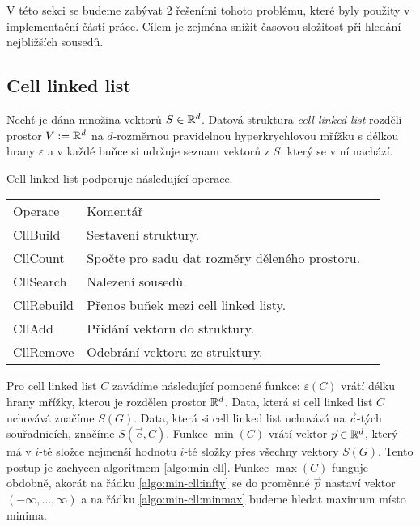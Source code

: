V této sekci se budeme zabývat 2 řešeními tohoto problému, které byly použity v implementační části práce. Cílem je zejména snížit časovou složitost při hledání nejbližších sousedů.

\subsection{Cell linked list}

\label{defi:cll}
\begin{defi}
  Nechť je dána množina vektorů $S \in \mathbb{R}^d$. Datová struktura \textit{cell linked list} rozdělí prostor $V := \mathbb{R}^d$ na $d$-rozměrnou pravidelnou hyperkrychlovou mřížku s délkou hrany $\varepsilon$ a v každé buňce si udržuje seznam vektorů z $S$, který se v ní nachází.\cite[s.~149--152]{computer_simulation_of_liquids}
\end{defi}

Cell linked list podporuje následující operace.

\begin{table}[ht!]
  \begin{tabular}{lll}
    Operace & Komentář\\
    CllBuild & Sestavení struktury.\\
    CllCount & Spočte pro sadu dat rozměry děleného prostoru.\\
    CllSearch & Nalezení sousedů.\\
    CllRebuild & Přenos buňek mezi cell linked listy.\\
    CllAdd & Přidání vektoru do struktury.\\
    CllRemove & Odebrání vektoru ze struktury.\\
  \end{tabular}
\end{table}

Pro cell linked list $C$ zavádíme následující pomocné funkce: $\varepsilon(C)$ vrátí délku hrany mřížky, kterou je rozdělen prostor $\mathbb{R}^d$.
Data, která si cell linked list $C$ uchovává značíme $S(G)$. Data, která si cell linked list uchovává na $\vec{c}$-tých souřadnicích, značíme $S(\vec{c}, C)$.
Funkce $\min(C)$ vrátí vektor $\vec{p} \in \mathbb{R}^d$, který má v $i$-té složce nejmenší hodnotu $i$-té složky přes všechny vektory $S(G)$. Tento postup je zachycen algoritmem \ref{algo:min-cll}. Funkce $\max(C)$ funguje obdobně, akorát na řádku \ref{algo:min-cll:infty} se do proměnné $\vec{p}$ nastaví vektor $(-\infty, \ldots, \infty)$ a na řádku \ref{algo:min-cll:minmax} budeme hledat maximum místo minima.


